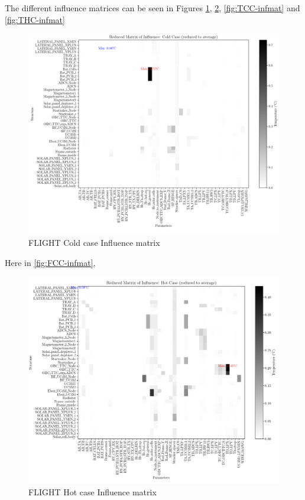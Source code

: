 The different influence matrices can be seen in Figures \ref{fig:FCC-infmat}, \ref{fig:FHC-infmat}, \ref{fig:TCC-infmat}  and \ref{fig:THC-infmat}
\begin{figure}[H]
    \centering
    \includegraphics[width = \linewidth]{Figures/UPMSat3/Flight/infmatCC-F.png}
    \caption{FLIGHT Cold case Influence matrix}
    \label{fig:FCC-infmat}
\end{figure}
Here in \autoref{fig:FCC-infmat}, 
\begin{figure}[H]
    \centering
    \includegraphics[width = \linewidth]{Figures/UPMSat3/Flight/infmatHC-F.png}
    \caption{FLIGHT Hot case Influence matrix}
    \label{fig:FHC-infmat}
\end{figure}
